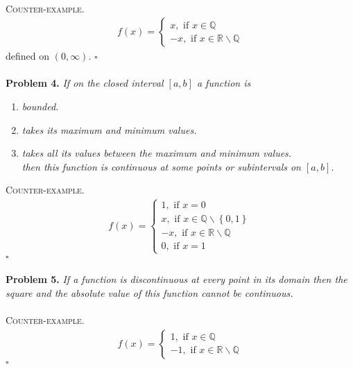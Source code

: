 \documentclass[a4paper]{article}
\numberwithin{equation}{section}
\begin{document}
\\
\textsc{Counter-example.} 
\begin{align}
f\left( x \right) = \left\{ {\begin{array}{*{20}{c}}
{x,\mbox{ if } x \in \mathbb{Q}}\\
{ - x,\mbox{ if } x \in \mathbb{R}\backslash \mathbb{Q}}
\end{array}} \right.
\end{align}
defined on $\left( {0,\infty } \right)$. \hfill $\square$\\
\\
\textbf{Problem 4.} \textit{If on the closed interval $[a,b]$ a function is}
\begin{enumerate}
\item \textit{bounded.}
\item \textit{takes its maximum and minimum values.}
\item \textit{takes all its values between the maximum and minimum values.\\
then this function is continuous at some points or subintervals on $[a,b]$.}
\end{enumerate}
\textsc{Counter-example.}
\begin{align}
f\left( x \right) = \left\{ {\begin{array}{*{20}{c}}
{1,\mbox{ if } x = 0}\\
{x,\mbox{ if } x \in \mathbb{Q}\backslash \left\{ {0,1} \right\}}\\
{ - x,\mbox{ if } x \in \mathbb{R}\backslash \mathbb{Q}}\\
{0,\mbox{ if } x = 1}
\end{array}} \right.
\end{align}
\hfill $\square$\\
\\
\textbf{Problem 5.} \textit{If a function is discontinuous at every point in its domain then the square and the absolute value of this function cannot be continuous.}\\
\\
\textsc{Counter-example.} 
\begin{align}
f\left( x \right) = \left\{ {\begin{array}{*{20}{c}}
{1,\mbox{ if } x \in \mathbb{Q}}\\
{ -1,\mbox{ if } x \in \mathbb{R}\backslash \mathbb{Q} }
\end{array}} \right.
\end{align}
\hfill $\square$\\
\\
\end{document}
